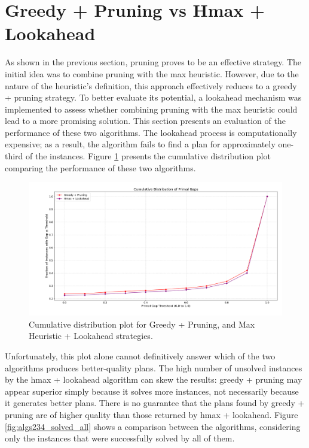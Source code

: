\section{Greedy + Pruning vs Hmax + Lookahead}
As shown in the previous section, pruning proves to be an effective strategy.
The initial idea was to combine pruning with the max heuristic. However, due to the nature of the heuristic’s definition,
this approach effectively reduces to a greedy + pruning strategy. To better evaluate its potential,
a lookahead mechanism was implemented to assess whether combining pruning with the max heuristic could lead
to a more promising solution. This section presents an evaluation of the performance of these two algorithms.
The lookahead process is computationally expensive; as a result, the algorithm fails to find a plan for approximately
one-third of the instances. Figure \ref{fig:algs23} presents the cumulative distribution plot comparing the performance
of these two algorithms.

\begin{figure}[ht]
	\centering
	\includegraphics[width=\textwidth]{images/algs23.png}
	\caption{Cumulative distribution plot for Greedy + Pruning, and Max Heuristic + Lookahead strategies.}
	\label{fig:algs23}
\end{figure}

Unfortunately, this plot alone cannot definitively answer which of the two algorithms produces better-quality plans.
The high number of unsolved instances by the hmax + lookahead algorithm can skew the results: greedy + pruning may
appear superior simply because it solves more instances, not necessarily because it generates better plans.
There is no guarantee that the plans found by greedy + pruning are of higher quality than those returned by hmax + lookahead.
Figure \ref{fig:algs234_solved_all} shows a comparison between the algorithms, considering only the instances that were successfully
solved by all of them.


